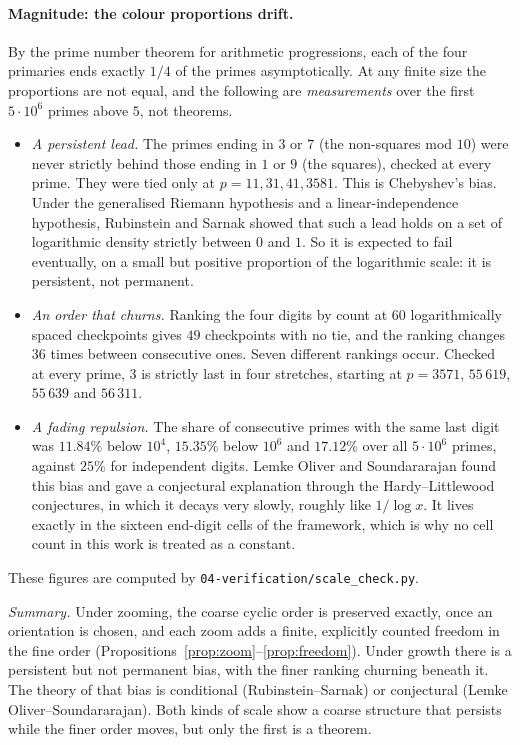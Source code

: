 \documentclass[11pt]{article}
\theoremstyle{plain}
\theoremstyle{definition}
\theoremstyle{remark}
\begin{document}
\paragraph{Magnitude: the colour proportions drift.} By the prime number theorem for arithmetic progressions,
each of the four primaries ends exactly $1/4$ of the primes asymptotically. At any finite size
the proportions are not equal, and the following are \emph{measurements} over the first
$5\cdot10^6$ primes above $5$, not theorems.
\begin{itemize}[nosep]
\item \emph{A persistent lead.} The primes ending in $3$ or $7$ (the non-squares mod $10$) were
never strictly behind those ending in $1$ or $9$ (the squares), checked at every prime. They were
tied only at $p=11,31,41,3581$. This is Chebyshev's bias. Under the generalised Riemann hypothesis
and a linear-independence hypothesis, Rubinstein and Sarnak \cite{RS} showed that such a lead holds
on a set of logarithmic density strictly between $0$ and $1$. So it is expected to fail eventually,
on a small but positive proportion of the logarithmic scale: it is persistent, not permanent.
\item \emph{An order that churns.} Ranking the four digits by count at $60$ logarithmically spaced
checkpoints gives $49$ checkpoints with no tie, and the ranking changes $36$ times between
consecutive ones. Seven different rankings occur. Checked at every prime, $3$ is strictly last in
four stretches, starting at $p=3571$, $55\,619$, $55\,639$ and $56\,311$.
\item \emph{A fading repulsion.} The share of consecutive primes with the same last digit was
$11.84\%$ below $10^4$, $15.35\%$ below $10^6$ and $17.12\%$ over all $5\cdot10^6$ primes, against
$25\%$ for independent digits. Lemke Oliver and Soundararajan \cite{LOS} found this bias and gave a
conjectural explanation through the Hardy--Littlewood conjectures, in which it decays very slowly,
roughly like $1/\log x$. It lives exactly in the sixteen end-digit cells of the framework, which is
why no cell count in this work is treated as a constant.
\end{itemize}
These figures are computed by \texttt{04-verification/scale\_check.py}.

\noindent
\emph{Summary.} Under zooming, the coarse cyclic order is preserved exactly, once an orientation is
chosen, and each zoom adds a finite, explicitly counted freedom in the fine order
(Propositions~\ref{prop:zoom}--\ref{prop:freedom}). Under growth there is a persistent but not
permanent bias, with the finer ranking churning beneath it. The theory of that bias is conditional
(Rubinstein--Sarnak) or conjectural (Lemke Oliver--Soundararajan). Both kinds of scale show a coarse
structure that persists while the finer order moves, but only the first is a theorem.
\end{document}
